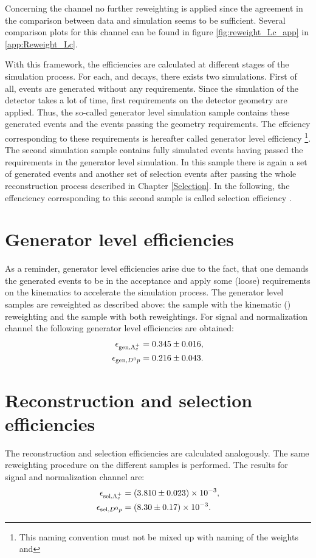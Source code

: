Concerning the channel \LbToLcmunu no further reweighting is applied since the agreement in the comparison between data and simulation seems to be sufficient.
Several comparison plots for this channel can be found in figure \ref{fig:reweight_Lc_app} in \ref{app:Reweight_Lc}.

With this framework, the efficiencies are calculated at different stages of the simulation process.
For each, \LbToDpmunuX and \LbToLcmunu decays, there exists two simulations.
First of all, events are generated without any requirements.
Since the simulation of the detector takes a lot of time, first requirements on the \lhcb detector geometry are applied.
Thus, the so-called generator level simulation sample contains these generated events and the events passing the geometry requirements.
The effciency corresponding to these requirements is hereafter called generator level efficiency \effGen\footnote{This naming convention must not be mixed up with naming of the weights  and }.
The second simulation sample contains fully simulated events having passed the requirements in the generator level simulation.
In this sample there is again a set of generated events and another set of selection events after passing the whole reconstruction process described in Chapter \ref{Selection}.
In the following, the effenciency corresponding to this second sample is called selection efficiency \effSel.

\section{Generator level efficiencies}
As a reminder, generator level efficiencies arise due to the fact, that one demands the generated events to be in the \lhcb acceptance and apply some (loose) requirements on the kinematics to accelerate the simulation process.
The generator level samples are reweighted as described above: the \LbToLcmunu sample with the kinematic \pt(\Lb) reweighting and the \LbToDpmunu sample with both reweightings.
For signal and normalization channel the following generator level efficiencies are obtained:
\begin{align*}
    \effGenLc &= \effGenLcval \pm \effGenLcerr, \\
    \effGenDp &= \effGenDpval \pm \effGenDperr.
\end{align*}

\section{Reconstruction and selection efficiencies}
The reconstruction and selection efficiencies are calculated analogously.
The same reweighting procedure on the different samples is performed.
The results for signal and normalization channel are:
\begin{align*}
    \effSelLc &= \num[scientific-notation=true]{\effSelLcval \pm \effSelLcerr}, \\
    \effSelDp &= \num[scientific-notation=true]{\effSelDpval \pm \effSelDperr}.
\end{align*}

